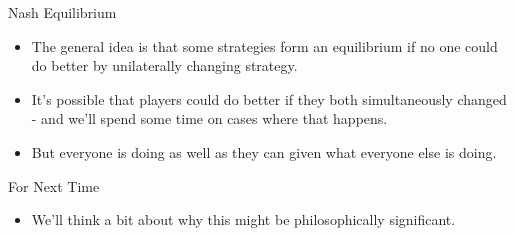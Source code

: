 \documentclass[
  ignorenonframetext,
]{beamer}
\providecommand{\tightlist}{%
  \setlength{\itemsep}{0pt}\setlength{\parskip}{0pt}}
\begin{document}
\begin{frame}{Nash Equilibrium}
\protect\hypertarget{nash-equilibrium-2}{}
\begin{itemize}
\tightlist
\item
  The general idea is that some strategies form an equilibrium if no one
  could do better by unilaterally changing strategy.
\item
  It's possible that players could do better if they both simultaneously
  changed - and we'll spend some time on cases where that happens.
\item
  But everyone is doing as well as they can given what everyone else is
  doing.
\end{itemize}
\end{frame}

\begin{frame}{For Next Time}
\protect\hypertarget{for-next-time}{}
\begin{itemize}
\tightlist
\item
  We'll think a bit about why this might be philosophically significant.
\end{itemize}
\end{frame}
\end{document}
